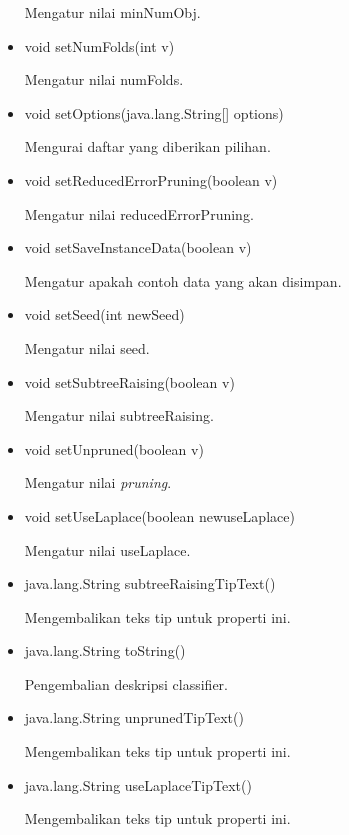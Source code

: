 \begin{itemize}
	Mengatur nilai minNumObj.
	
	\item void setNumFolds(int v)
	
	Mengatur nilai numFolds.
	
	\item void setOptions(java.lang.String[] options)
	
	Mengurai daftar yang diberikan pilihan.
	
	\item void setReducedErrorPruning(boolean v)
	
	Mengatur nilai reducedErrorPruning.
	
	\item void setSaveInstanceData(boolean v)
	
	Mengatur apakah contoh data yang akan disimpan.
	
	\item void setSeed(int newSeed)
	
	Mengatur nilai seed.
	
	\item void setSubtreeRaising(boolean v)
	
	Mengatur nilai subtreeRaising.
	
	\item void setUnpruned(boolean v)
	
	Mengatur nilai \textsl{pruning}.
	
	\item void setUseLaplace(boolean newuseLaplace)
	
	Mengatur nilai useLaplace.
	
	\item java.lang.String subtreeRaisingTipText()
	
	Mengembalikan teks tip untuk properti ini.
	
	\item java.lang.String toString()
	
	Pengembalian deskripsi classifier.
	
	\item java.lang.String unprunedTipText()
	
	Mengembalikan teks tip untuk properti ini.
	
	\item java.lang.String useLaplaceTipText()
	
	Mengembalikan teks tip untuk properti ini.
\end{itemize}

















